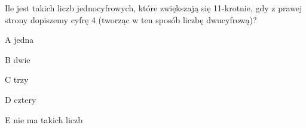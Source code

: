 \begin{tresc}
Ile jest takich liczb jednocyfrowych, które zwiększają się 11-krotnie, gdy z prawej strony dopiszemy cyfrę 4 (tworząc w ten sposób liczbę dwucyfrową)?
\end{tresc}
\begin{wariant}{A} jedna \end{wariant}
\begin{wariant}{B} dwie \end{wariant}
\begin{wariant}{C} trzy \end{wariant}
\begin{wariant}{D} cztery \end{wariant}
\begin{wariant}{E} nie ma takich liczb \end{wariant}
